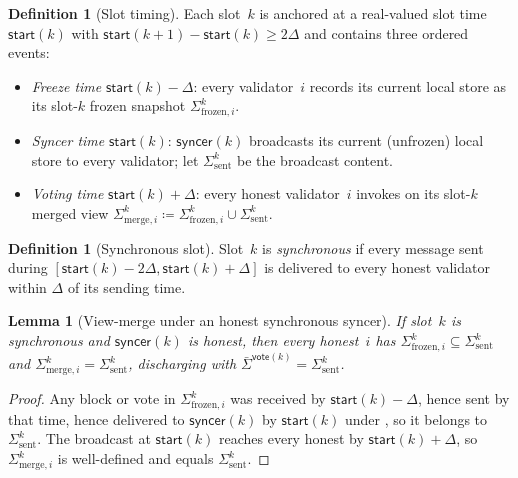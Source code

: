 \documentclass{article}
\newcommand{\syncer}{\mathsf{syncer}}
\newcommand{\start}{\mathsf{start}}
\newcommand{\vote}{\mathsf{vote}}
\newcommand{\comm}[1]{\bar{#1}}
\theoremstyle{plain}
\newtheorem{lemma}{Lemma}
\theoremstyle{definition}
\newtheorem{definition}[theorem]{Definition}
\theoremstyle{remark}
\begin{document}
\begin{definition}[Slot timing]\label{rev:def:slot-timing}
Each slot~$k$ is anchored at a real-valued slot time $\start(k)$ with $\start(k+1) - \start(k) \geq 2\Delta$ and contains three ordered events:
\begin{itemize}
  \item \emph{Freeze time} $\start(k) - \Delta$: every validator~$i$ records its current local store as its slot-$k$ frozen snapshot $\Sigma^k_{\mathrm{frozen},i}$.
  \item \emph{Syncer time} $\start(k)$: $\syncer(k)$ broadcasts its current (unfrozen) local store to every validator; let $\Sigma^k_{\mathrm{sent}}$ be the broadcast content.
  \item \emph{Voting time} $\start(k) + \Delta$: every honest validator~$i$ invokes  on its slot-$k$ merged view $\Sigma^k_{\mathrm{merge},i} \coloneqq \Sigma^k_{\mathrm{frozen},i} \cup \Sigma^k_{\mathrm{sent}}$.
\end{itemize}
\end{definition}

\begin{definition}[Synchronous slot]\label{rev:def:synchrony-window}
Slot~$k$ is \emph{synchronous} if every message sent during $[\start(k) - 2\Delta, \start(k) + \Delta]$ is delivered to every honest validator within $\Delta$ of its sending time.
\end{definition}

\begin{lemma}[View-merge under an honest synchronous syncer]\label{rev:lem:view-merge}
If slot~$k$ is synchronous and $\syncer(k)$ is honest, then every honest~$i$ has $\Sigma^k_{\mathrm{frozen},i} \subseteq \Sigma^k_{\mathrm{sent}}$ and $\Sigma^k_{\mathrm{merge},i} = \Sigma^k_{\mathrm{sent}}$, discharging  with $\comm{\Sigma}^{\vote(k)} = \Sigma^k_{\mathrm{sent}}$.
\end{lemma}

\begin{proof}
Any block or vote in $\Sigma^k_{\mathrm{frozen},i}$ was received by $\start(k) - \Delta$, hence sent by that time, hence delivered to $\syncer(k)$ by $\start(k)$ under , so it belongs to $\Sigma^k_{\mathrm{sent}}$.
The broadcast at $\start(k)$ reaches every honest by $\start(k) + \Delta$, so $\Sigma^k_{\mathrm{merge},i}$ is well-defined and equals $\Sigma^k_{\mathrm{sent}}$.
\end{proof}
\end{document}
